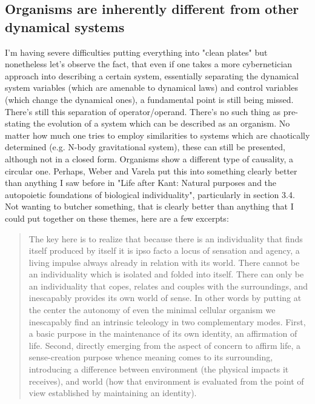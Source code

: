 \documentclass[a4paper,12pt,twoside,leqno]{article}
\begin{document}
\subsection*{Organisms are inherently different from other dynamical systems}
I'm having severe difficulties putting everything into "clean plates" but nonetheless let's observe the fact, that even if one takes a more cybernetician approach into describing a certain system, essentially separating the dynamical system variables (which are amenable to dynamical laws) and control variables (which change the dynamical ones), a fundamental point is still being missed. There's still this separation of operator/operand. There's no such thing as pre-stating the evolution of a system which can be described as an organism. No matter how much one tries to employ similarities to systems which are chaotically determined (e.g. N-body gravitational system), these can still be presented, although not in a closed form. Organisms show a different type of causality, a circular one. Perhaps, Weber and Varela put this into something clearly better than anything I saw before in "Life after Kant: Natural purposes and the autopoietic foundations of biological individuality", particularly in section 3.4. Not wanting to butcher something, that is clearly better than anything that I could put together on these themes, here are a few excerpts:
\begin{quote}
The key here is to realize that because there is an individuality that finds itself produced by itself it is ipso facto a locus of sensation and agency, a living
impulse always already in relation with its world. There cannot be an individuality which is isolated and folded into itself. There can only be an individuality that copes, relates and couples with the surroundings, and inescapably
provides its own world of sense. In other words by putting at the center the
autonomy of even the minimal cellular organism we inescapably find an intrinsic teleology in two complementary modes. First, a basic purpose in the
maintenance of its own identity, an affirmation of life. Second, directly emerging from the aspect of concern to affirm life, a sense-creation purpose whence
meaning comes to its surrounding, introducing a difference between environment (the physical impacts it receives), and world (how that environment is
evaluated from the point of view established by maintaining an identity).
\end{quote}
\end{document}
